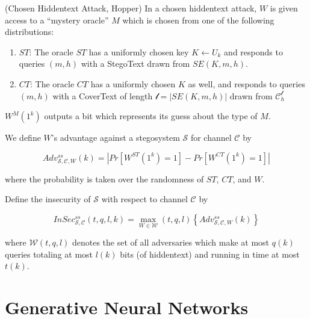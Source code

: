 \documentclass[english,version-2020-11]{uzl-thesis}
\begin{document}
\begin{definition}
(Chosen Hiddentext Attack, Hopper) In a chosen hiddentext attack, $W$ is given access to a ``mystery oracle'' $M$ which is chosen from one of the following distributions:

\begin{enumerate}
\item $ST$: The oracle $ST$ has a uniformly chosen key $K \leftarrow U_k$ and responds to queries $(m, h)$ with a StegoText drawn from $SE(K, m, h)$.
\item $CT$: The oracle $CT$ has a uniformly chosen $K$ as well, and responds to queries $(m, h)$ with a CoverText of length $\mathcal{l} = |SE(K, m, h)|$ drawn from $\mathcal{C}_h^{\mathcal{l}}$
\end{enumerate}

$W^M(1^k)$ outputs a bit which represents its guess about the type of $M$.

We define $W$'s advantage against a stegosystem $\mathcal{S}$ for channel $\mathcal{C}$ by

$$Adv_{\mathcal{S}, \mathcal{C}, W}^{ss}(k) = |Pr[W^{ST}(1^k)=1] - Pr[W^{CT}(1^k)=1]|$$

where the probability is taken over the randomness of $ST$, $CT$, and $W$. 

Define the insecurity of $\mathcal{S}$ with respect to channel $\mathcal{C}$ by

$$InSec_{\mathcal{S}, \mathcal{C}}^{ss}(t, q, l, k) = \max_{W \in \mathcal{W}}(t, q, l) \left\{ Adv_{\mathcal{S}, \mathcal{C}, W}^{ss}(k) \right\}$$

where $\mathcal{W}(t, q, l)$ denotes the set of all adversaries which make at most $q(k)$ queries totaling at most $l(k)$ bits (of hiddentext) and running in time at most $t(k)$.
\end{definition}

\section{Generative Neural Networks}
\end{document}
